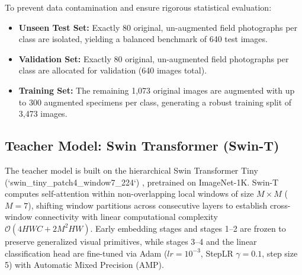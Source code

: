 \documentclass[journal,10pt,twocolumn]{article}
\begin{document}
To prevent data contamination and ensure rigorous statistical evaluation:
\begin{itemize}
    \item \textbf{Unseen Test Set:} Exactly 80 original, un-augmented field photographs per class are isolated, yielding a balanced benchmark of 640 test images.
    \item \textbf{Validation Set:} Exactly 80 original, un-augmented field photographs per class are allocated for validation (640 images total).
    \item \textbf{Training Set:} The remaining 1,073 original images are augmented with up to 300 augmented specimens per class, generating a robust training split of 3,473 images.
\end{itemize}

\subsection{Teacher Model: Swin Transformer (Swin-T)}
The teacher model is built on the hierarchical Swin Transformer Tiny (`swin\_tiny\_patch4\_window7\_224`) \cite{liu2021swin}, pretrained on ImageNet-1K. Swin-T computes self-attention within non-overlapping local windows of size $M \times M$ ($M=7$), shifting window partitions across consecutive layers to establish cross-window connectivity with linear computational complexity $\mathcal{O}(4HWC + 2M^2HW)$. Early embedding stages and stages 1--2 are frozen to preserve generalized visual primitives, while stages 3--4 and the linear classification head are fine-tuned via Adam ($lr = 10^{-3}$, StepLR $\gamma = 0.1$, step size 5) with Automatic Mixed Precision (AMP).
\end{document}
